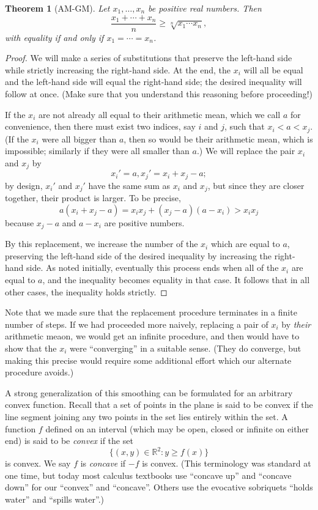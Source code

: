 \documentclass[12pt]{report}
\newtheorem{theorem}{Theorem}
\def\RR{\mathbb{R}}
\numberwithin{exc}{section}
\begin{document}
\begin{theorem}[AM-GM]
	Let $x_{1}, \dots, x_{n}$ be positive real numbers. Then
	\[
	\frac{x_{1} + \cdots + x_{n}}{n} \geq \sqrt[n]{x_{1}\cdots x_{n}},
	\]
	with equality if and only if $x_{1} = \cdots = x_{n}$.
\end{theorem}
\begin{proof}
	We will make a series of substitutions that preserve the left-hand 
	side while strictly increasing the right-hand side. At the end, the 
	$x_{i}$ will all be equal and the left-hand side will equal the 
	right-hand side; the desired inequality will follow at once. (Make 
	sure that you understand this reasoning before proceeding!)
	
	If the $x_{i}$ are not already all equal to their arithmetic mean, 
	which we call $a$ for convenience, then there must exist two indices, 
	say $i$ and $j$, such that $x_{i} < a < x_{j}$. (If the $x_{i}$ were 
	all bigger than $a$, then so would be their arithmetic mean, which 
	is impossible; similarly if they were all smaller than $a$.) We will 
	replace the pair $x_{i}$ and $x_{j}$ by
	\[
	x_{i}' = a, x_{j}' = x_{i} + x_{j} - a;
	\]
	by design, $x_{i}'$ and $x_{j}'$ have the same sum as $x_{i}$ and 
	$x_{j}$, but since they are closer together, their product is larger. 
	To be precise,
	\[
	a(x_{i} + x_{j} - a) = x_{i}x_{j} + (x_{j} - a)(a - x_{i}) > x_{i}x_{j}
	\]
	because $x_{j}-a$ and $a-x_{i}$ are positive numbers.
	
	By this replacement, we increase the number of the $x_{i}$ which are 
	equal to $a$, preserving the left-hand side of the desired inequality 
	by increasing the right-hand side. As noted initially, eventually 
	this process ends when all of the $x_{i}$ are equal to $a$, and the 
	inequality becomes equality in that case. It follows that in all 
	other cases, the inequality holds strictly.
\end{proof}
Note that we made sure that the replacement procedure terminates in a finite
number of steps. If we had proceeded more naively, replacing a pair of $x_i$
by \emph{their} arithmetic meaon, we would get an infinite procedure, and then
would have to show that the $x_i$ were ``converging'' in a suitable sense.
(They do converge, but making this precise would require some additional effort
which our alternate procedure avoids.)

A strong generalization of this smoothing can be formulated for an 
arbitrary convex function.
Recall that a set of points in the plane is said to be convex if the 
line segment joining any two points in the set lies entirely within 
the set.
A function $f$ defined on an interval (which may be open, 
closed or infinite on either end) is said to be \emph{convex} if the 
set
\[
\{ (x, y) \in \RR^{2}: y \geq f(x) \}
\]
is convex. We say $f$ is \emph{concave} if $-f$ is convex. (This 
terminology was standard at one time, but today
most calculus textbooks use ``concave up'' 
and ``concave down'' for our ``convex'' and ``concave''. Others use 
the evocative sobriquets ``holds water'' and ``spills water''.)
\end{document}
